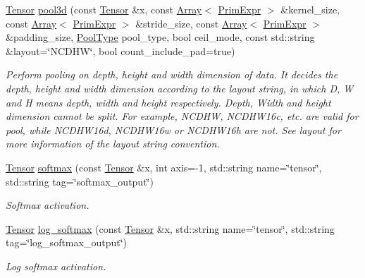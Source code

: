 \begin{DoxyCompactItemize}
\hyperlink{classtvm_1_1te_1_1Tensor}{Tensor} \hyperlink{namespacetopi_1_1nn_af84c2ac0c1fd4ec7db5c9bc661bd5aab}{pool3d} (const \hyperlink{classtvm_1_1te_1_1Tensor}{Tensor} \&x, const \hyperlink{classtvm_1_1Array}{Array}$<$ \hyperlink{classtvm_1_1PrimExpr}{Prim\+Expr} $>$ \&kernel\+\_\+size, const \hyperlink{classtvm_1_1Array}{Array}$<$ \hyperlink{classtvm_1_1PrimExpr}{Prim\+Expr} $>$ \&stride\+\_\+size, const \hyperlink{classtvm_1_1Array}{Array}$<$ \hyperlink{classtvm_1_1PrimExpr}{Prim\+Expr} $>$ \&padding\+\_\+size, \hyperlink{namespacetopi_1_1nn_ac531cfce9c3a031fa25cfb6ed1f9b95b}{Pool\+Type} pool\+\_\+type, bool ceil\+\_\+mode, const std\+::string \&layout=\char`\"{}N\+C\+D\+HW\char`\"{}, bool count\+\_\+include\+\_\+pad=true)
\begin{DoxyCompactList}\small\item\em Perform pooling on depth, height and width dimension of data. It decides the depth, height and width dimension according to the layout string, in which \textquotesingle{}D\textquotesingle{}, \textquotesingle{}W\textquotesingle{} and \textquotesingle{}H\textquotesingle{} means depth, width and height respectively. Depth, Width and height dimension cannot be split. For example, N\+C\+D\+HW, N\+C\+D\+H\+W16c, etc. are valid for pool, while N\+C\+D\+H\+W16d, N\+C\+D\+H\+W16w or N\+C\+D\+H\+W16h are not. See {\itshape layout} for more information of the layout string convention. \end{DoxyCompactList}\item 
\hyperlink{classtvm_1_1te_1_1Tensor}{Tensor} \hyperlink{namespacetopi_1_1nn_a1c845f2e02a677c556929d41a399e729}{softmax} (const \hyperlink{classtvm_1_1te_1_1Tensor}{Tensor} \&x, int axis=-\/1, std\+::string name=\char`\"{}tensor\char`\"{}, std\+::string tag=\char`\"{}softmax\+\_\+output\char`\"{})
\begin{DoxyCompactList}\small\item\em Softmax activation. \end{DoxyCompactList}\item 
\hyperlink{classtvm_1_1te_1_1Tensor}{Tensor} \hyperlink{namespacetopi_1_1nn_a667b9b98da3fd9a918a603d1b8aad5d7}{log\+\_\+softmax} (const \hyperlink{classtvm_1_1te_1_1Tensor}{Tensor} \&x, std\+::string name=\char`\"{}tensor\char`\"{}, std\+::string tag=\char`\"{}log\+\_\+softmax\+\_\+output\char`\"{})
\begin{DoxyCompactList}\small\item\em Log softmax activation. \end{DoxyCompactList}\end{DoxyCompactItemize}


